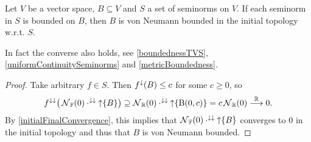 \begin{lemma} \label{boundedOnGeneratingSeminormsImpliesvonNeumannBounded}
Let $V$ be a vector space, $B\subseteq V$ and $S$ a set of seminorms on $V$. If each seminorm in $S$ is bounded on $B$, then $B$ is von Neumann bounded in the initial topology w.r.t. $S$.
\end{lemma}
In fact the converse also holds, see \ref{boundednessTVS}, \ref{uniformContinuitySeminorms} and \ref{metricBoundedness}.
\begin{proof}
Take arbitrary $f\in S$. Then $f^{\downarrow}(B) \leq c$ for some $c\geq 0$, so
\[ f^{\downarrow\downarrow}\big(\operatorname{\mathcal{N}}_{\mathbb{F}}(0)\cdot^{\downarrow\downarrow}\operatorname{\uparrow}\{B\}\big) \supseteq \operatorname{\mathcal{N}}_{\mathbb{R}}(0)\cdot^{\downarrow\downarrow}\operatorname{\uparrow}\{\operatorname{B}(0,c)\} = c\operatorname{\mathcal{N}}_{\mathbb{R}}(0) \overset{\mathbb{R}}{\longrightarrow} 0. \]
By \ref{initialFinalConvergence}, this implies that $\operatorname{\mathcal{N}}_{\mathbb{F}}(0)\cdot^{\downarrow\downarrow}\operatorname{\uparrow}\{B\}$ converges to $0$ in the initial topology and thus that $B$ is von Neumann bounded.
\end{proof}

